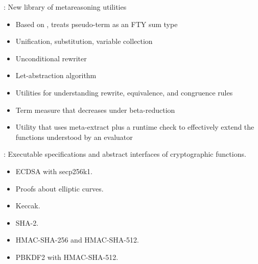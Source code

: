 
\begin{frame}

\newlibtitle


:
New library of metareasoning utilities
\begin{itemize}
\item Based on , treats pseudo-term as an FTY sum type
\item Unification, substitution, variable collection
\item Unconditional rewriter
\item Let-abstraction algorithm
\item Utilities for understanding rewrite, equivalence, and congruence rules
\item Term measure that decreases under beta-reduction
\item Utility that uses meta-extract plus a runtime check to
  effectively extend the functions understood by an evaluator
\end{itemize}

\end{frame}


\begin{frame}

\newlibtitle

:
Executable specifications and abstract interfaces of cryptographic functions.
\begin{itemize}
\item
ECDSA with secp256k1.
\item
Proofs about elliptic curves.
\item
Keccak.
\item
SHA-2.
\item
HMAC-SHA-256 and HMAC-SHA-512.
\item
PBKDF2 with HMAC-SHA-512.
\end{itemize}

\end{frame}


